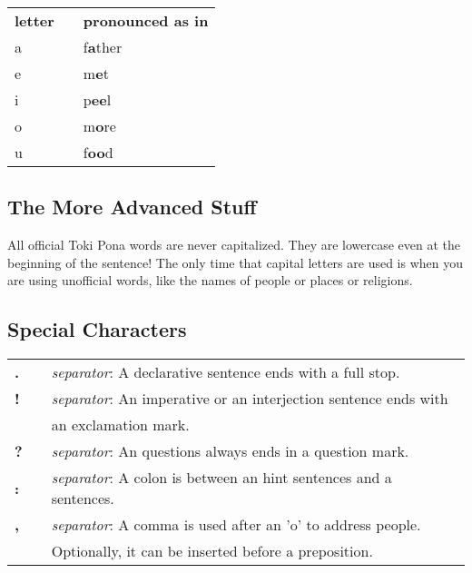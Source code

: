 \begin{supertabular}{p{2cm}|ll}
    \textbf{letter} &  & \textbf{pronounced as in} \\
    a               &  & f\textbf{a}ther           \\
    e               &  & m\textbf{e}t              \\
    i               &  & p\textbf{ee}l             \\
    o               &  & m\textbf{o}re             \\
    u               &  & f\textbf{oo}d             \\
\end{supertabular}

\subsection*{The More Advanced Stuff}
All official Toki Pona words are never capitalized.
They are lowercase even at the beginning of the sentence!
The only time that capital letters are used is when you are using unofficial words, like the names of people or places or religions.

\subsection*{Special Characters}

\begin{supertabular}{p{2cm}|ll}
    \textbf{.} &  & \textit{separator}: A declarative sentence ends with a full stop.         \\
    \textbf{!} &  & \textit{separator}: An imperative or an interjection sentence ends with   \\ &&  an exclamation mark. \\
    \textbf{?} &  & \textit{separator}: An questions always ends in a question mark.          \\
    \textbf{:} &  & \textit{separator}: A colon is between an hint sentences and a sentences. \\
    \textbf{,} &  & \textit{separator}: A comma is used after an 'o' to address people.       \\ && Optionally, it can be inserted before a preposition. \\
\end{supertabular}

